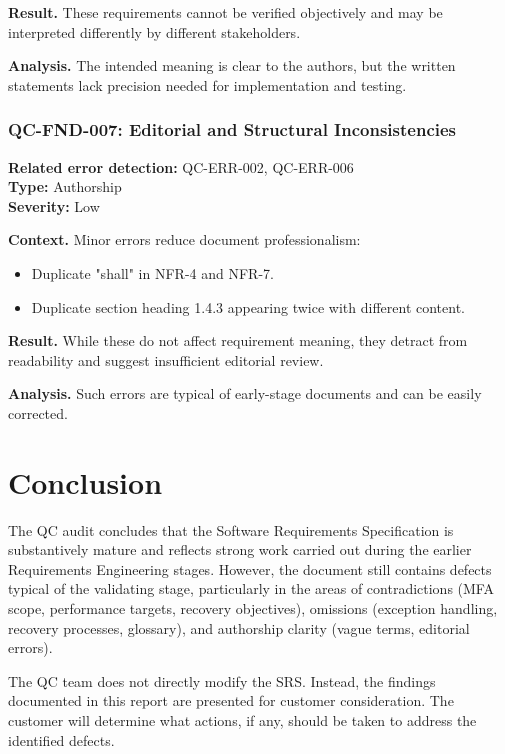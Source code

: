 \documentclass[11pt,a4paper]{article}
\begin{document}
\textbf{Result.} These requirements cannot be verified objectively and may be interpreted differently by different stakeholders.

\textbf{Analysis.} The intended meaning is clear to the authors, but the written statements lack precision needed for implementation and testing.

\subsubsection*{QC-FND-007: Editorial and Structural Inconsistencies}
\textbf{Related error detection:} QC-ERR-002, QC-ERR-006 \\
\textbf{Type:} Authorship \\
\textbf{Severity:} Low

\textbf{Context.} Minor errors reduce document professionalism:
\begin{itemize}
\item Duplicate "shall" in NFR-4 and NFR-7.
\item Duplicate section heading 1.4.3 appearing twice with different content.
\end{itemize}

\textbf{Result.} While these do not affect requirement meaning, they detract from readability and suggest insufficient editorial review.

\textbf{Analysis.} Such errors are typical of early-stage documents and can be easily corrected.

\section{Conclusion}

The QC audit concludes that the Software Requirements Specification is substantively mature and reflects strong work carried out during the earlier Requirements Engineering stages. However, the document still contains defects typical of the validating stage, particularly in the areas of contradictions (MFA scope, performance targets, recovery objectives), omissions (exception handling, recovery processes, glossary), and authorship clarity (vague terms, editorial errors).

The QC team does not directly modify the SRS. Instead, the findings documented in this report are presented for customer consideration. The customer will determine what actions, if any, should be taken to address the identified defects.
\end{document}
